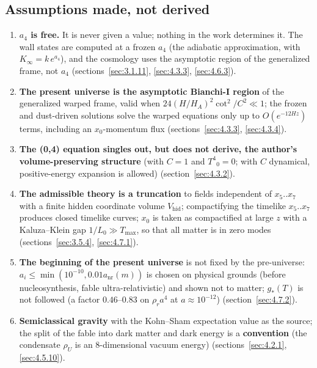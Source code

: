 \subsection{Assumptions made, not derived}
\label{sec:8.2}

\begin{enumerate}
  \item \textbf{$a_{4}$ is free.} It is never given a value; nothing in the work determines it. The wall states are computed at a frozen $a_{4}$ (the adiabatic approximation, with $K_\infty=k\,e^{a_4}$), and the cosmology uses the asymptotic region of the generalized frame, not $a_{4}$ (sections~\ref{sec:3.1.11}, \ref{sec:4.3.3}, \ref{sec:4.6.3}).
  \item \textbf{The present universe is the asymptotic Bianchi-I region} of the generalized warped frame, valid when $24 (H/H_A)^{2} \cot^{2}/C^{2} \ll 1$; the frozen and dust-driven solutions solve the warped equations only up to $O(e^{-12Hz})$ terms, including an $x_{0}$-momentum flux (sections~\ref{sec:4.3.3}, \ref{sec:4.3.4}).
  \item \textbf{The (0,4) equation singles out, but does not derive, the author's volume-preserving structure} (with $C = 1$ and $T^4{}_0=0$; with $C$ dynamical, positive-energy expansion is allowed) (section~\ref{sec:4.3.2}).
  \item \textbf{The admissible theory is a truncation} to fields independent of $x_5..x_7$ with a finite hidden coordinate volume $V_{\mathrm{hid}}$; compactifying the timelike $x_5..x_7$ produces closed timelike curves; $x_{0}$ is taken as compactified at large $z$ with a Kaluza--Klein gap $1/L_0 \gg T_{\max}$, so that all matter is in zero modes (sections~\ref{sec:3.5.4}, \ref{sec:4.7.1}).
  \item \textbf{The beginning of the present universe} is not fixed by the pre-universe: $a_i \leq \min(10^{-10}, 0.01 a_{\mathrm{nr}}(m))$ is chosen on physical grounds (before nucleosynthesis, fable ultra-relativistic) and shown not to matter; $g_*(T)$ is not followed (a factor $0.46\text{--}0.83$ on $\rho_r a^{4}$ at $a \approx 10^{-12}$) (section~\ref{sec:4.7.2}).
  \item \textbf{Semiclassical gravity} with the Kohn--Sham expectation value as the source; the split of the fable into dark matter and dark energy is a \textbf{convention} (the condensate $\rho_U$ is an 8-dimensional vacuum energy) (sections~\ref{sec:4.2.1}, \ref{sec:4.5.10}).
\end{enumerate}

